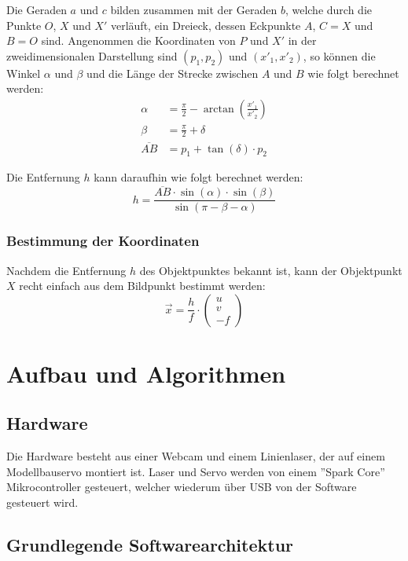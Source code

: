 \documentclass[ngerman,a4paper,parskip=half]{scrartcl}
\begin{document}
Die Geraden $a$ und $c$ bilden zusammen mit der Geraden $b$, welche durch die Punkte $O$, $X$ und $X'$ verläuft, ein Dreieck, dessen Eckpunkte $A$, $C = X$ und $B = O$ sind. Angenommen die Koordinaten von $P$ und $X'$ in der zweidimensionalen Darstellung sind $(p_1,p_2)$ und $(x'_1, x'_2)$, so können die Winkel $\alpha$ und $\beta$ und die Länge der Strecke zwischen $A$ und $B$ wie folgt berechnet werden:
\begin{align*}
	\alpha &= \frac{\pi}{2} - \arctan\left(\frac{x'_1}{x'_2}\right)\\
	\beta &= \frac{\pi}{2} + \delta\\
	\overline{AB} &= p_1 + \tan(\delta) \cdot p_2
\end{align*}

Die Entfernung $h$ kann daraufhin wie folgt berechnet werden:
\[ h = \frac{\overline{AB} \cdot \sin(\alpha) \cdot \sin(\beta)}{\sin(\pi - \beta - \alpha)} \]

\subsubsection{Bestimmung der Koordinaten}

Nachdem die Entfernung $h$ des Objektpunktes bekannt ist, kann der Objektpunkt $X$ recht einfach aus dem Bildpunkt bestimmt werden:
\[ \vec{x} = \frac{h}{f} \cdot \begin{pmatrix}
u \\ v \\ -f
\end{pmatrix} \]


\section{Aufbau und Algorithmen}

\subsection{Hardware}

Die Hardware besteht aus einer Webcam und einem Linienlaser, der auf einem Modellbauservo montiert ist. Laser und Servo werden von einem ''Spark Core'' Mikrocontroller gesteuert, welcher wiederum über USB von der Software gesteuert wird.

\subsection{Grundlegende Softwarearchitektur}
\end{document}
